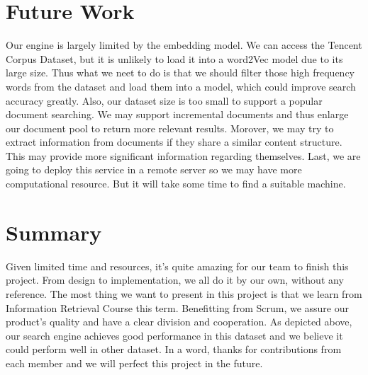 \documentclass[UTF8]{article}
\begin{document}
	\section{Future Work}
	Our engine is largely limited by the embedding model. We can access the Tencent Corpus Dataset, but it is unlikely to load it into a word2Vec model due to its large size. Thus what we neet to do is that we should filter those high frequency words from the dataset and load them into a model, which could improve search accuracy greatly.
	Also, our dataset size is too small to support a popular document searching. We may support incremental documents and thus enlarge our document pool to return more relevant results.
	Morover, we may try to extract information from documents if they share a similar content structure. This may provide more significant information regarding themselves.
	Last, we are going to deploy this service in a remote server so we may have more computational resource. But it will take some time to find a suitable machine.
	
	\section{Summary}
	Given limited time and resources, it's quite amazing for our team to finish this project. From design to implementation, we all do it by our own, without any reference. The most thing we want to present in this project is that we learn from Information Retrieval Course this term. Benefitting from Scrum, we assure our product's quality and have a clear division and cooperation. As depicted above, our search engine achieves good performance in this dataset and we believe it could perform well in other dataset.
	In a word, thanks for contributions from each member and we will perfect this project in the future.
	
\end{document}

